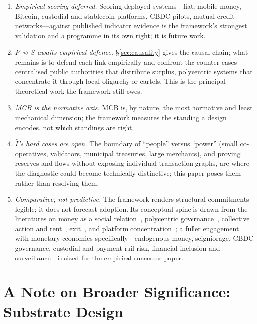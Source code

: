 \documentclass[11pt]{article}
\theoremstyle{definition}
\newcommand{\Iax}{\ensuremath{\hat{I}}}
\begin{document}
\begin{enumerate}
\item \emph{Empirical scoring deferred.} Scoring deployed systems---fiat, mobile
  money, Bitcoin, custodial and stablecoin platforms, CBDC pilots, mutual-credit
  networks---against published indicator evidence is the framework's strongest
  validation and a programme in its own right; it is future work.
\item \emph{$P \rightsquigarrow S$ awaits empirical defence.} \S\ref{sec:causality}
  gives the causal chain; what remains is to defend each link empirically and confront
  the counter-cases---centralised public authorities that distribute surplus,
  polycentric systems that concentrate it through local oligarchy or cartels. This is
  the principal theoretical work the framework still owes.
\item \emph{MCB is the normative axis.} MCB is, by nature, the most normative and
  least mechanical dimension; the framework measures the standing a design encodes,
  not which standings are right.
\item \emph{$\Iax$'s hard cases are open.} The boundary of ``people'' versus
  ``power'' (small co-operatives, validators, municipal treasuries, large merchants),
  and proving reserves and flows without exposing individual transaction graphs, are
  where the diagnostic could become technically distinctive; this paper poses them
  rather than resolving them.
\item \emph{Comparative, not predictive.} The framework renders structural
  commitments legible; it does not forecast adoption. Its conceptual spine is drawn
  from the literatures on money as a social relation~\cite{ingham2004}, polycentric
  governance~\cite{ostrom1990}, collective action and rent~\cite{olson1965},
  exit~\cite{hirschman1970}, and platform concentration~\cite{srnicek2017}; a fuller
  engagement with monetary economics specifically---endogenous money, seigniorage,
  CBDC governance, custodial and payment-rail risk, financial inclusion and
  surveillance---is sized for the empirical successor paper.
\end{enumerate}

\section{A Note on Broader Significance: Substrate Design}
\label{sec:broader}
\end{document}
